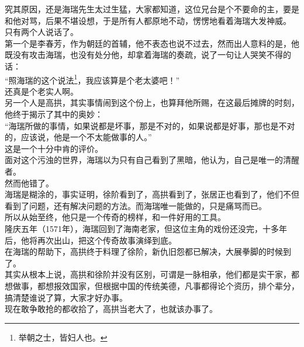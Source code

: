 \begin{multicols}{\theparacolNo}
究其原因，还是海瑞先生太过生猛，大家都知道，这位兄台是个不要命的主，要是和他对骂，后果不堪设想，于是所有人都原地不动，愣愣地看着海瑞大发神威。\\

只有两个人说话了。\\

第一个是李春芳，作为朝廷的首辅，他不表态也说不过去，然而出人意料的是，他既没有攻击海瑞，也没有处分他，却拿着海瑞的奏疏，说了一句让人哭笑不得的话：\\

“照海瑞的这个说法\footnote{举朝之士，皆妇人也。}，我应该算是个老太婆吧！”\\

还真是个老实人啊。\\

另一个人是高拱，其实事情闹到这个份上，也算拜他所赐，在这最后摊牌的时刻，他终于揭示了其中的奥妙：\\

“海瑞所做的事情，如果说都是坏事，那是不对的，如果说都是好事，那也是不对的，应该说，他是一个不太能做事的人。”\\

这是一个十分中肯的评价。\\

面对这个污浊的世界，海瑞以为只有自己看到了黑暗，他认为，自己是唯一的清醒者。\\

然而他错了。\\

海瑞是糊涂的，事实证明，徐阶看到了，高拱看到了，张居正也看到了，他们不但看到了问题，还有解决问题的方法。而海瑞唯一能做的，只是痛骂而已。\\

所以从始至终，他只是一个传奇的榜样，和一件好用的工具。\\

隆庆五年（1571年），海瑞回到了海南老家，但这位主角的戏份还没完，十多年后，他将再次出山，把这个传奇故事演绎到底。\\

在海瑞的帮助下，高拱终于料理了徐阶，新仇旧怨都已解决，大展拳脚的时候到了。\\

其实从根本上说，高拱和徐阶并没有区别，可谓是一脉相承，他们都是实干家，都想做事，都想报效国家，但根据中国的传统美德，凡事都得论个资历，排个辈分，搞清楚谁说了算，大家才好办事。\\

现在敢争敢抢的都收拾了，高拱当老大了，也就该办事了。\\


\end{multicols}
